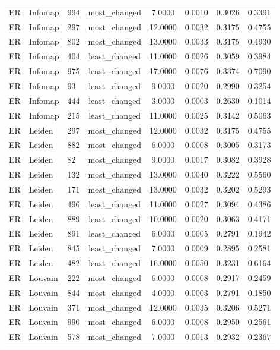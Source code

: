 \begin{longtable}{lllccccc}
ER & Infomap & 994 & most\_changed & 7.0000 & 0.0010 & 0.3026 & 0.3391 \\
ER & Infomap & 297 & most\_changed & 12.0000 & 0.0032 & 0.3175 & 0.4755 \\
ER & Infomap & 802 & most\_changed & 13.0000 & 0.0033 & 0.3175 & 0.4930 \\
ER & Infomap & 404 & least\_changed & 11.0000 & 0.0026 & 0.3059 & 0.3984 \\
ER & Infomap & 975 & least\_changed & 17.0000 & 0.0076 & 0.3374 & 0.7090 \\
ER & Infomap & 93 & least\_changed & 9.0000 & 0.0020 & 0.2990 & 0.3254 \\
ER & Infomap & 444 & least\_changed & 3.0000 & 0.0003 & 0.2630 & 0.1014 \\
ER & Infomap & 215 & least\_changed & 11.0000 & 0.0025 & 0.3142 & 0.5063 \\
ER & Leiden & 297 & most\_changed & 12.0000 & 0.0032 & 0.3175 & 0.4755 \\
ER & Leiden & 882 & most\_changed & 6.0000 & 0.0008 & 0.3005 & 0.3173 \\
ER & Leiden & 82 & most\_changed & 9.0000 & 0.0017 & 0.3082 & 0.3928 \\
ER & Leiden & 132 & most\_changed & 13.0000 & 0.0040 & 0.3222 & 0.5560 \\
ER & Leiden & 171 & most\_changed & 13.0000 & 0.0032 & 0.3202 & 0.5293 \\
ER & Leiden & 496 & least\_changed & 11.0000 & 0.0027 & 0.3094 & 0.4386 \\
ER & Leiden & 889 & least\_changed & 10.0000 & 0.0020 & 0.3063 & 0.4171 \\
ER & Leiden & 891 & least\_changed & 6.0000 & 0.0005 & 0.2791 & 0.1942 \\
ER & Leiden & 845 & least\_changed & 7.0000 & 0.0009 & 0.2895 & 0.2581 \\
ER & Leiden & 482 & least\_changed & 16.0000 & 0.0050 & 0.3231 & 0.6164 \\
ER & Louvain & 222 & most\_changed & 6.0000 & 0.0008 & 0.2917 & 0.2459 \\
ER & Louvain & 844 & most\_changed & 4.0000 & 0.0003 & 0.2791 & 0.1850 \\
ER & Louvain & 371 & most\_changed & 12.0000 & 0.0035 & 0.3206 & 0.5271 \\
ER & Louvain & 990 & most\_changed & 6.0000 & 0.0008 & 0.2950 & 0.2561 \\
ER & Louvain & 578 & most\_changed & 7.0000 & 0.0013 & 0.2932 & 0.2367 \\

\end{longtable}
